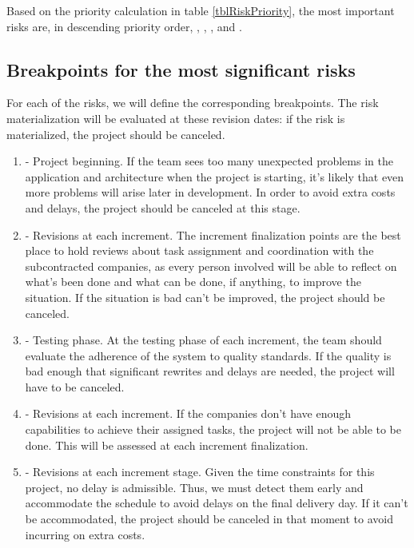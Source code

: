Based on the priority calculation in table \ref{tblRiskPriority}, the most important risks are, in descending priority order, , , ,  and .

\subsection{Breakpoints for the most significant risks}

For each of the risks, we will define the corresponding breakpoints. The risk materialization will be evaluated at these revision dates: if the risk is materialized, the project should be canceled.

\begin{enumerate}
\item {} - Project beginning. If the team sees too many unexpected problems in the application and architecture when the project is starting, it's likely that even more problems will arise later in development. In order to avoid extra costs and delays, the project should be canceled at this stage.
\item {} - Revisions at each increment. The increment finalization points are the best place to hold reviews about task assignment and coordination with the subcontracted companies, as every person involved will be able to reflect on what's been done and what can be done, if anything, to improve the situation. If the situation is bad can't be improved, the project should be canceled.
\item {} - Testing phase. At the testing phase of each increment, the team should evaluate the adherence of the system to quality standards. If the quality is bad enough that significant rewrites and delays are needed, the project will have to be canceled.
\item {} - Revisions at each increment. If the companies don't have enough capabilities to achieve their assigned tasks, the project will not be able to be done. This will be assessed at each increment finalization.
\item {} - Revisions at each increment stage. Given the time constraints for this project, no delay is admissible. Thus, we must detect them early and accommodate the schedule to avoid delays on the final delivery day. If it can't be accommodated, the project should be canceled in that moment to avoid incurring on extra costs.
\end{enumerate}
